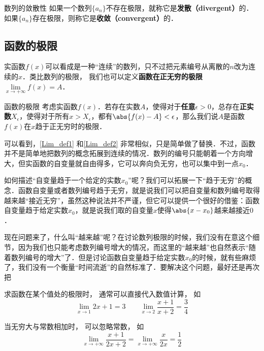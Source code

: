 \begin{definition}{数列的敛散性}
如果一个数列$\{a_n\}$不存在极限，就称它是\textbf{发散（divergent）}的．如果$\{a_n\}$存在极限，则称它是\textbf{收敛（convergent）}的．
\end{definition}

\subsection{函数的极限}
实函数$f(x)$可以看成是一种“连续”的数列，只不过把元素编号从离散的$n$改为连续的$x$．类比数列的极限， 我们也可以定义\textbf{函数在正无穷的极限} $\lim\limits_{x\to +\infty} f(x) = A$．

\begin{definition}{函数的极限}\label{Lim_def1}
考虑实函数$f(x)$．若存在实数$A$，使得对于\textbf{任意}$\epsilon>0$，总存在\textbf{正实数}$X_\epsilon$，使得对于所有$x>X_\epsilon$，都有$\abs{f(x)-A}<\epsilon$，那么我们说$A$是函数$f(x)$在$x$趋于正无穷时的极限．
\end{definition}

可以看到，\autoref{Lim_def1} 和\autoref{Lim_def2} 非常相似，只是简单做了替换．不过，函数并不是简单地把数列的概念拓展到连续的情况．数列的编号只能朝着一个方向增大，但实函数的自变量就自由得多，它可以奔向负无穷，也可以集中到一点$x_0$．

如何描述“自变量趋于一个给定的实数$x_0$”呢？我们可以拓展一下“趋于无穷”的概念．函数自变量或者数列编号趋于无穷，就是说我们可以把自变量和数列编号取得越来越“接近无穷”，虽然这种说法并不严谨，但它可以提供一个很好的借鉴：函数自变量趋于给定实数$x_0$，就是说我们取的自变量$x$使得$\abs{x-x_0}$越来越接近$0$．

现在问题来了，什么叫“越来越”呢？在讨论数列极限的时候，我们没有在意这个细节，因为我们也只能考虑数列编号增大的情况，而这里的“越来越”也自然表示“随着数列编号的增大”了．但是讨论函数自变量趋于给定实数$x_0$的时候，就有些麻烦了，我们没有一个衡量“时间流逝”的自然标准了．要解决这个问题，最好还是再次把



\begin{example}{}
求函数在某个值处的极限时， 通常可以直接代入数值计算， 如
\begin{equation}
\lim_{x\to 1} 2x + 1 = 3 \qquad \lim_{x\to 2}\frac{x + 1}{x + 2} = \frac34
\end{equation}

当无穷大与常数相加时， 可以忽略常数， 如
\begin{equation}
\lim_{x\to +\infty} \frac{x + 1}{2x + 2} = \lim_{x\to +\infty} \frac{x}{2x} = \frac12
\end{equation}
\end{example}

